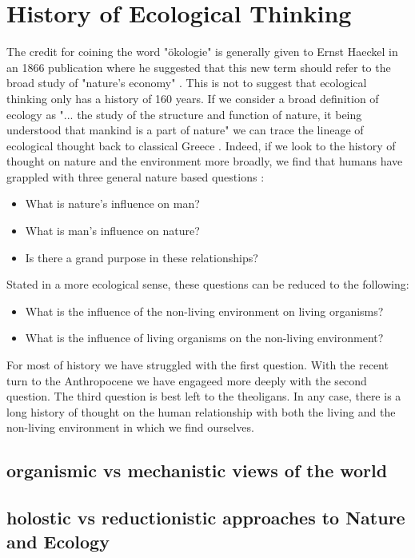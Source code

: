\section {History of Ecological Thinking}

The credit for coining the word "ökologie" is generally given to Ernst Haeckel in an 1866 publication where he suggested that this new term should refer to the broad study of "nature's economy" \cite{worster_1977}. This is not to suggest that ecological thinking only has a history of 160 years. If we consider a broad definition of ecology as "... the study of the structure and function of nature, it being understood that mankind is a part of nature" we can trace the lineage of ecological thought back to classical Greece \cite{odum_1953}. Indeed, if we look to the history of thought on nature and the environment more broadly, we find that humans have grappled with three general nature based questions \cite{glacken_1967}: \begin{itemize} \item What is nature's influence on man? \item What is man's influence on nature? \item Is there a grand purpose in these relationships? \end{itemize} Stated in a more ecological sense, these questions can be reduced to the following: \begin{itemize} \item What is the influence of the non-living environment on living organisms? \item What is the influence of living organisms on the non-living environment? \end{itemize} For most of history we have struggled with the first question. With the recent turn to the Anthropocene we have engageed more deeply with the second question. The third question is best left to the theoligans. In any case, there is a long history of thought on the human relationship with both the living and the non-living environment in which we find ourselves.


\subsection{organismic vs mechanistic views of the world}

\cite{ranganathan_1931}
\cite{tansley_1935}

\subsection{holostic vs reductionistic approaches to Nature and Ecology}

